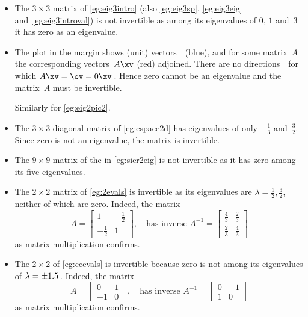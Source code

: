 \begin{example} \label{eg:}
\begin{itemize}
\item The \(3\times 3\) matrix of \autoref{eg:eig3intro} (also \ref{eg:eig3sp}, \ref{eg:eig3eig} and~\ref{eg:eig3introval}) is not invertible as among its eigenvalues of \(0\), \(1\) and~\(3\) it has zero as an eigenvalue.

\item The plot in the margin shows (unit) vectors~\xv\ (blue), and for some matrix~\(A\) the corresponding vectors~\(A\xv\) (red) adjoined.
%
There are no directions~\xv\ for which \(A\xv=\ov=0\xv\)\,. 
Hence zero cannot be an eigenvalue and the matrix~\(A\) must be invertible.

Similarly for \autoref{eg:eig2pic2}.

\item The \(3\times3\) diagonal matrix of \autoref{eg:espace2d} has eigenvalues of only \(-\tfrac13\) and~\(\tfrac32\).
Since zero is not an eigenvalue, the matrix is invertible.

\item The \(9\times9\) matrix of the  in \autoref{eg:sier2eig} is not invertible as it has zero among its five eigenvalues.

\item The \(2\times 2\) matrix of \autoref{eg:2evals} is invertible as its eigenvalues are \(\lambda=\frac12,\frac32\), neither of which are zero.
Indeed, the matrix
\begin{equation*}
A=\begin{bmatrix} 1&-\frac12\\-\frac12&1 \end{bmatrix},
\quad\text{has inverse }A^{-1}=\begin{bmatrix} \frac43&\frac23\\\frac23&\frac43 \end{bmatrix}
\end{equation*}
as matrix multiplication confirms.

\item The \(2\times2\)  of \autoref{eg:ccevals} is invertible because zero is not among its eigenvalues of \(\lambda=\pm 1.5\)\,.
Indeed, the matrix
\begin{equation*}
A=\begin{bmatrix} 0&1\\-1&0 \end{bmatrix},
\quad\text{has inverse }A^{-1}=\begin{bmatrix} 0&-1\\1&0 \end{bmatrix}
\end{equation*}
as matrix multiplication confirms.

\end{itemize}
\end{example}



